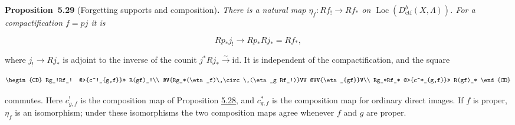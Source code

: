 \documentclass[11pt]{article}
\newenvironment{bpstatement}[2]{\par\addvspace{0.6\baselineskip}\noindent\textbf{#1}#2\textbf{.}\enspace\ignorespaces}
  {\par\addvspace{0.4\baselineskip}}
\newenvironment{bpstatementit}[2]{\begin{bpstatement}{#1}{#2}\itshape\ignorespaces}{\end{bpstatement}}
\providecommand{\Loc}{}\renewcommand{\Loc}{\operatorname{Loc}}
\begin{document}
\label{bp499}%
\begin{bpstatementit}{Proposition~5.29}{ (Forgetting supports and composition)}
There is a natural map \(\eta_f:Rf_!\to Rf_*\) on \(\Loc(D^b_{\mathrm{ctf}}(X,\Lambda))\). For a compactification \(f=pj\) it is

\[
Rp_*j_!\longrightarrow Rp_*Rj_*=Rf_*,
\]

where \(j_!\to Rj_*\) is adjoint to the inverse of the counit \(j^*Rj_*\xrightarrow{\sim}\mathrm{id}\). It is independent of the compactification, and the square

\[
\begin{CD}
Rg_!Rf_! @>{c^!_{g,f}}>> R(gf)_!\\
@V{Rg_*(\eta_f)\,\circ\,(\eta_g Rf_!)}VV @VV{\eta_{gf}}V\\
Rg_*Rf_* @>{c^*_{g,f}}>> R(gf)_*
\end{CD}
\]

commutes. Here \(c^!_{g,f}\) is the composition map of Proposition \hyperref[bp496]{5.28}, and \(c^*_{g,f}\) is the composition map for ordinary direct images. If \(f\) is proper, \(\eta_f\) is an isomorphism; under these isomorphisms the two composition maps agree whenever \(f\) and \(g\) are proper.
\end{bpstatementit}
\end{document}

